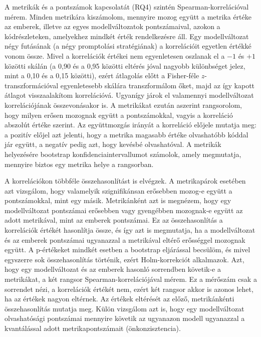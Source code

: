 \documentclass[
]{elteikthesis}[2024/04/26]
\begin{document}
A metrikák és a pontszámok kapcsolatát (RQ4) szintén Spearman-korrelációval
mérem. Minden metrikára kiszámolom, mennyire mozog együtt a metrika értéke az
emberek, illetve az egyes modellváltozatok pontszámaival, azokon a
kódrészleteken, amelyekhez mindkét érték rendelkezésre áll. Egy modellváltozat
négy futásának (a négy promptolási stratégiának) a korrelációit egyetlen értékké
vonom össze. Mivel a korrelációk értékei nem egyenletesen oszlanak el a $-1$ és
$+1$ közötti skálán (a 0,90 és a 0,95 közötti eltérés jóval nagyobb különbséget
jelez, mint a 0,10 és a 0,15 közötti), ezért átlagolás előtt a Fisher-féle
$z$-transzformációval egyenletesebb skálára transzformálom őket, majd az így
kapott átlagot visszaalakítom korrelációvá. Ugyanígy járok el valamennyi
modellváltozat korrelációjának összevonásakor is. A metrikákat ezután aszerint
rangsorolom, hogy milyen erősen mozognak együtt a pontszámokkal, vagyis a
korreláció abszolút értéke szerint. Az együttmozgás irányát a korreláció előjele
mutatja meg: a pozitív előjel azt jelenti, hogy a metrika magasabb értéke
olvashatóbb kóddal jár együtt, a negatív pedig azt, hogy kevésbé olvashatóval. A
metrikák helyezésére bootstrap konfidenciaintervallumot számolok, amely
megmutatja, mennyire biztos egy metrika helye a rangsorban.

A korrelációkon többféle összehasonlítást is elvégzek. A metrikapárok esetében
azt vizsgálom, hogy valamelyik szignifikánsan erősebben mozog-e együtt a
pontszámokkal, mint egy másik. Metrikánként azt is megnézem, hogy egy
modellváltozat pontszámai erősebben vagy gyengébben mozognak-e együtt az adott
metrikával, mint az emberek pontszámai. Ez az összehasonlítás a korrelációk
értékét hasonlítja össze, és így azt is megmutatja, ha a modellváltozat és az
emberek pontszámai ugyanazzal a metrikával eltérő erősséggel mozognak együtt. A
p-értékeket mindkét esetben a bootstrap eljárással becsülöm, és mivel egyszerre
sok összehasonlítás történik, ezért Holm-korrekciót alkalmazok. Azt, hogy egy
modellváltozat és az emberek hasonló sorrendben követik-e a metrikákat, a két
rangsor Spearman-korrelációjával mérem. Ez a mérőszám csak a sorrendet nézi, a
korrelációk értékét nem, ezért két rangsor akkor is azonos lehet, ha az értékek
nagyon eltérnek. Az értékek eltérését az előző, metrikánkénti összehasonlítás
mutatja meg. Külön vizsgálom azt is, hogy egy modellváltozat olvashatósági
pontszámai mennyire követik az ugyanazon modell ugyanazzal a kvantálással adott
metrikapontszámait (önkonzisztencia).
\end{document}
